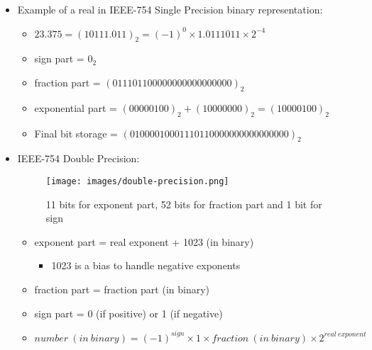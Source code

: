\documentclass[handout]{beamer}[10pt, usepdftitle=false]
\begin{document}
	\begin{frame}
	\begin{itemize}
		\item{Example of a real in IEEE-754 Single Precision binary representation: 
			\begin{itemize}
				\item{$23.375 = (10111.011)_2 = (-1)^0 \times 1.0111011 \times 2^{-4}$}
				\item{sign part = $0_2$}
				\item{fraction part = $(011101100000000000000000)_2$}
				\item{exponential part = $(00000100)_2 + (10000000)_2 = (10000100)_2$}
				\item{Final bit storage = $(01000010001110110000000000000000)_2$}
			\end{itemize}							
		}
	\end{itemize}			
	
	\begin{itemize}
		\item{IEEE-754 Double Precision:
		\begin{center}
		\begin{figure}
		\texttt{[image: images/double-precision.png]} 
     	\vspace*{-0.5em}
		\caption{11 bits for exponent part, 52 bits for fraction part and 1 bit for sign}
		\end{figure}
		\end{center}	
	
		\begin{itemize}
		\item{exponent part = real exponent + 1023 (in binary)
		\begin{itemize}
			\item{1023 is a bias to handle negative exponents}
		\end{itemize}	
		}		
		\item{fraction part = fraction part (in binary)}
		\item{sign part = 0 (if positive) or 1 (if negative)}
		\item{\textbf{$number\ (in\ binary) = (-1)^{sign} \times 1 \times fraction\ (in\ binary) \times 2^{real\ exponent}$}} 	
		\end{itemize}		
	
		}	
	\end{itemize}		
		
	\end{frame}		  
		  
		  
\end{document}
